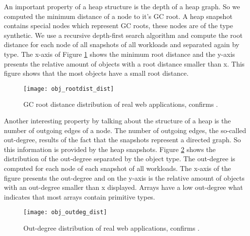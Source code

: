 An important property of a heap structure is the depth of a heap graph. So we computed the minimum distance of a node to it's GC root. A heap snapshot contains special nodes which represent GC roots, these nodes are of the type synthetic. We use a recursive depth-first search algorithm and compute the root distance for each node of all snapshots of all workloads and separated again by type. The x-axis of Figure \ref{fig:obj_rootdist_dist} shows the minimum root distance and the y-axis presents the relative amount of objects with a root distance smaller than x. This figure shows that the most objects have a small root distance.
\begin{figure}
	\centering
	\texttt{[image: obj\_rootdist\_dist]}
	\caption{GC root distance distribution of real web applications, confirms \cite{JSMeter2009}.}
	\label{fig:obj_rootdist_dist}
\end{figure}

Another interesting property by talking about the structure of a heap is the number of outgoing edges of a node. The number of outgoing edges, the so-called out-degree, results of the fact that the snapshots represent a directed graph. So this information is provided by the heap snapshots. Figure \ref{fig:obj_outdeg_dist} shows the distribution of the out-degree separated by the object type. The out-degree is computed for each node of each snapshot of all workloads. The x-axis of the figure presents the out-degree and on the y-axis is the relative amount of objects with an out-degree smaller than x displayed. Arrays have a low out-degree what indicates that most arrays contain primitive types. 
\begin{figure}
	\centering
	\texttt{[image: obj\_outdeg\_dist]}
	\caption{Out-degree distribution of real web applications, confirms \cite{JSMeter2009}.}
	\label{fig:obj_outdeg_dist}
\end{figure}

